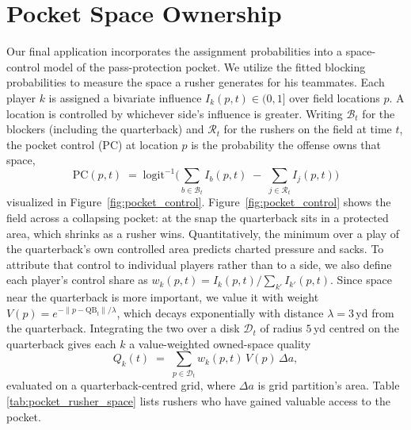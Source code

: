 \documentclass[USenglish]{article}
\theoremstyle{dgthm}
\theoremstyle{dgdef}
\begin{document}
\section{Pocket Space Ownership} \label{pocketspace}
Our final application incorporates the assignment probabilities into a space-control model of the pass-protection pocket. We utilize the fitted blocking probabilities to measure the space a rusher generates for his teammates. Each player $k$ is assigned a bivariate influence $I_k(p,t)\in(0,1]$ over field locations $p$. A location is controlled by whichever side's influence is greater. Writing $\mathcal{B}_t$ for the blockers (including the quarterback) and $\mathcal{R}_t$ for the rushers on the field at time $t$, the pocket control (PC) at location $p$ is the probability the offense owns that space,
\begin{equation}
\mathrm{PC}(p,t) \;=\; \mathrm{logit}^{-1}\Big( \textstyle\sum_{b \in \mathcal{B}_t} I_b(p,t) \;-\; \sum_{j \in \mathcal{R}_t} I_j(p,t) \Big) \label{eq:pc}
\end{equation}
visualized in Figure~\ref{fig:pocket_control}. Figure~\ref{fig:pocket_control} shows the field across a collapsing pocket: at the snap the quarterback sits in a protected area, which shrinks as a rusher wins. Quantitatively, the minimum over a play of the quarterback's own controlled area predicts charted pressure and sacks. 
To attribute that control to individual players rather than to a side, we also define each player's control share  as $w_k(p,t) = I_k(p,t) / \sum_{k'} I_{k'}(p,t)$. Since space near the quarterback is more important, we value it with weight $V(p)=e^{-\lVert p-\mathrm{QB}_t\rVert/\lambda}$, which decays exponentially with distance $\lambda = 3$\,yd from the quarterback.  Integrating the two over a disk $\mathcal{D}_t$ of radius $5$\,yd centred on the quarterback gives each $k$ a value-weighted owned-space quality
\begin{equation}
Q_k(t) \;=\; \sum_{p \in \mathcal{D}_t} w_k(p,t)\, V(p)\, \Delta a , \label{eq:q}
\end{equation}
evaluated on a quarterback-centred grid, where $\Delta a$ is grid partition's area. Table \ref{tab:pocket_rusher_space} lists rushers who have gained valuable access to the pocket. 
\end{document}
